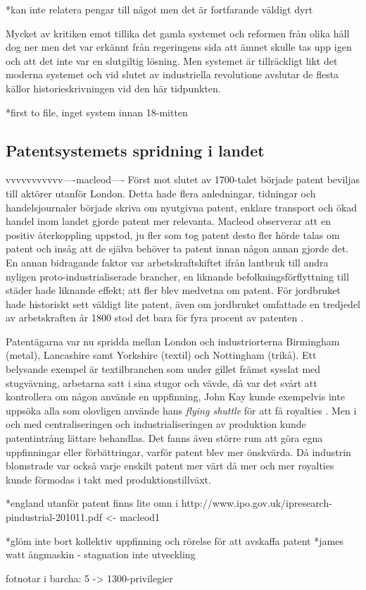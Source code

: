 *kan inte relatera pengar till något men det är fortfarande väldigt dyrt

Mycket av kritiken emot tillika det gamla systemet och reformen från olika håll dog ner men det var erkännt från regeringens sida att ämnet skulle tas upp igen och att det inte var en slutgiltig lösning\cite{dutton}. Men systemet är tillräckligt likt det moderna systemet och vid slutet av industriella revolutione avslutar de flesta källor historieskrivningen vid den här tidpunkten.

*first to file, inget system innan 18-mitten


\subsection{Patentsystemets spridning i landet}
\label{sub:patentsystemets_spridning_i_landet}

vvvvvvvvvvv----macleod----
Först mot slutet av 1700-talet började patent beviljas till aktörer utanför London. Detta hade flera
anledningar, tidningar och handelsjournaler började skriva om nyutgivna patent, enklare transport och
ökad handel inom landet gjorde patent mer relevanta\cite{macleod}. Macleod observerar att en positiv återkoppling uppstod, ju fler som tog
patent desto fler hörde talas om patent och insåg att de själva behöver ta patent innan någon annan gjorde
det. En annan bidragande faktor var arbetskraftskiftet ifrån lantbruk till andra nyligen
proto-industrialiserade brancher, en liknande befolkningsförflyttning till städer hade liknande effekt;
att fler blev medvetna om patent\cite{macleod}. För jordbruket hade historiskt sett väldigt lite patent, även om
jordbruket omfattade en tredjedel av arbetskraften år 1800 stod det bara för fyra procent av patenten
\cite{macleod2}.

Patentägarna var nu spridda mellan London och industriorterna Birmingham (metal), Lancashire samt
Yorkshire (textil) och Nottingham (trikå). Ett belysande exempel är textilbranchen som under gillet
främst sysslat med stugvävning, arbetarna satt i sina stugor och vävde, då var det svårt att
kontrollera om någon använde en uppfinning, John Kay kunde exempelvis inte uppsöka alla som olovligen
använde hans \emph{flying shuttle} för att få royalties \cite{macleod}. Men i och med centraliseringen och industrialiseringen av produktion kunde patentintrång lättare behandlas. Det fanns även större rum att göra
egna uppfinningar eller förbättringar, varför patent blev mer önskvärda. Då industrin blomstrade var
också varje enskilt patent mer värt då mer och mer royalties kunde förmodas i takt med
produktionstillväxt.


*england utanför patent finns lite omn i http://www.ipo.gov.uk/ipresearch-pindustrial-201011.pdf <- macleod1


*glöm inte bort kollektiv uppfinning och rörelse för att avskaffa patent 
*james watt ångmaskin - stagnation inte utveckling


fotnotar i barcha: 5 -> 1300-privilegier


